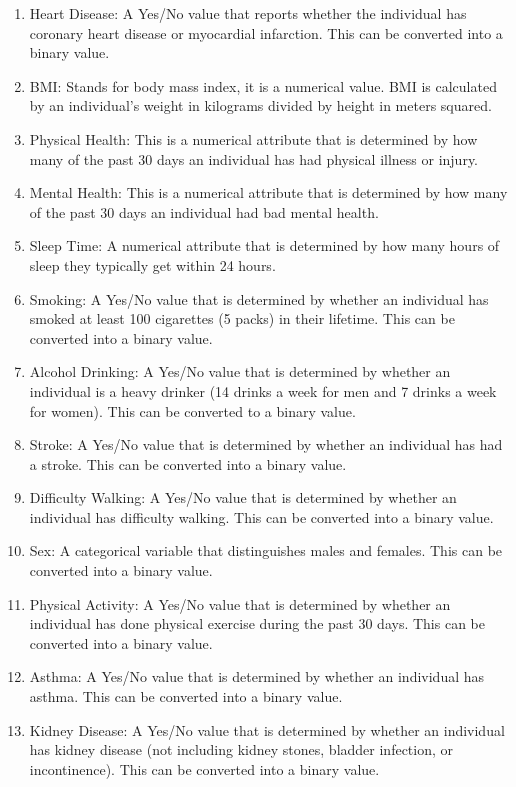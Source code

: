 \documentclass[a4paper]{article}
\begin{document}
\begin{enumerate}
\item Heart Disease: A Yes/No value that reports whether the individual has coronary heart disease or myocardial infarction. This can be converted into a binary value.
\item BMI: Stands for body mass index, it is a numerical value. BMI is calculated by an individual's weight in kilograms divided by height in meters squared.
\item Physical Health: This is a numerical attribute that is determined by how many of the past 30 days an individual has had physical illness or injury. 
\item Mental Health: This is a numerical attribute that is determined by how many of the past 30 days an individual had bad mental health.
\item Sleep Time: A numerical attribute that is determined by how many hours of sleep they typically get within 24 hours.
\item Smoking: A Yes/No value that is determined by whether an individual has smoked at least 100 cigarettes (5 packs) in their lifetime. This can be converted into a binary value.
\item Alcohol Drinking: A Yes/No value that is determined by whether an individual is a heavy drinker (14 drinks a week for men and 7 drinks a week for women). This can be converted to a binary value.
\item Stroke: A Yes/No value that is determined by whether an individual has had a stroke. This can be converted into a binary value.
\item Difficulty Walking: A Yes/No value that is determined by whether an individual has difficulty walking. This can be converted into a binary value.
\item Sex: A categorical variable that distinguishes males and females. This can be converted into a binary value.
\item Physical Activity: A Yes/No value that is determined by whether an individual has done physical exercise during the past 30 days. This can be converted into a binary value.
\item Asthma: A Yes/No value that is determined by whether an individual has asthma. This can be converted into a binary value.
\item Kidney Disease: A Yes/No value that is determined by whether an individual has kidney disease (not including kidney stones, bladder infection, or incontinence). This can be converted into a binary value.

\end{enumerate}
\end{document}
